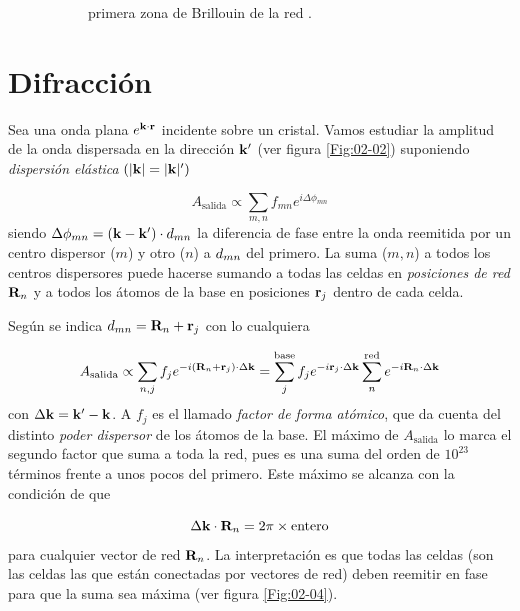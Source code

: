 \begin{figure}[h!]
\begin{subfigure}{0.45\linewidth}
	\caption{primera zona de Brillouin de la red \fcc.}
	\end{subfigure}
	\caption{}
\end{figure}

\section{Difracción}

Sea una onda plana $e^{\mathbf{k} \cdot \mathbf{r}}$ incidente sobre un cristal. Vamos estudiar la amplitud de la onda dispersada en la dirección $\mathbf{k}'$ (ver figura \ref{Fig:02-02}) suponiendo \textit{dispersión elástica} $(|\mathbf{k}|=|\mathbf{k}|')$

\begin{equation}
    A_{\text{salida}} \propto \sum_{m,n} f_{mn} e^{i \Delta \phi_{mn}}
\end{equation}
siendo $\Delta \phi_{mn} = (\mathbf{k} - \mathbf{k}') \cdot \mathbf{}d_{mn}$ la diferencia de fase entre la onda reemitida por un centro dispersor ($m$) y otro ($n$) a $\mathbf{}d_{mn}$ del primero. La suma ($m,n$) a todos los centros dispersores puede hacerse sumando a todas las celdas en \textit{posiciones de red} $\mathbf{R}_n$ y a todos los átomos de la base en posiciones $\mathbf{r}_j$ dentro de cada celda. 

Según se indica $\mathbf{}d_{mn}=\mathbf{R}_n+\mathbf{r}_j$ con lo cualquiera

\begin{equation}
    A_{\text{salida}} \propto  \sum_{n,j} f_j e^{-i (\mathbf{R}_n + \mathbf{r}_j) \cdot \Delta \mathbf{k}} = \sum_j^{\text{base}} f_j e^{-i \mathbf{r}_j \cdot \Delta \mathbf{k}} \sum_{n}^{\text{red}} e^{-i\mathbf{R}_n \cdot \Delta \mathbf{k}} \label{Ec:02-02-02}
\end{equation}
con $\Delta \mathbf{k} = \mathbf{k}' - \mathbf{k}$. A $f_j$ es el llamado \textit{factor de forma atómico}, que da cuenta del distinto \textit{poder dispersor} de los átomos de la base. El máximo de $A_{\text{salida}}$ lo marca el segundo factor que suma a toda la red, pues es una suma del orden de $10^{23}$ términos frente a unos pocos del primero. Este máximo se alcanza con la condición de que

\begin{equation}
    \Delta \mathbf{k} \cdot \mathbf{R}_n = 2 \pi \times \text{entero} \label{Ec:02-02-03}
\end{equation}
para cualquier vector de red $\mathbf{R}_n$. La interpretación es que todas las celdas (son las celdas las que están conectadas por vectores de red) deben reemitir en fase para que la suma sea máxima (ver figura \ref{Fig:02-04}).
    


